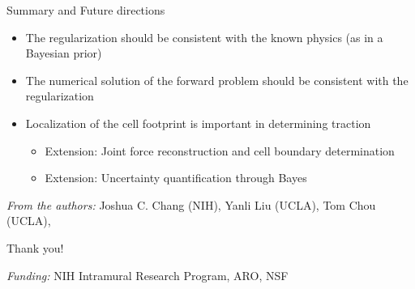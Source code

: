\documentclass[presentation,aspectratio=169]{beamer}
\begin{document}
\begin{frame}{Summary and Future directions}
\begin{itemize}
\item The regularization should be consistent with the known physics (as in a Bayesian prior)
\item The numerical solution of the forward problem should be consistent with the regularization
\item Localization of the cell footprint is important in determining traction
\begin{itemize}
\item Extension: Joint force reconstruction and cell boundary determination
\item Extension: Uncertainty quantification through Bayes
\end{itemize}
\end{itemize}

\centering



\smallskip
\emph{From the authors:} {Joshua C. Chang (NIH), Yanli Liu (UCLA), Tom Chou (UCLA)}, 

\smallskip
Thank you!

\smallskip

\emph{Funding:} NIH Intramural Research Program, ARO, NSF

\end{frame}
\end{document}
